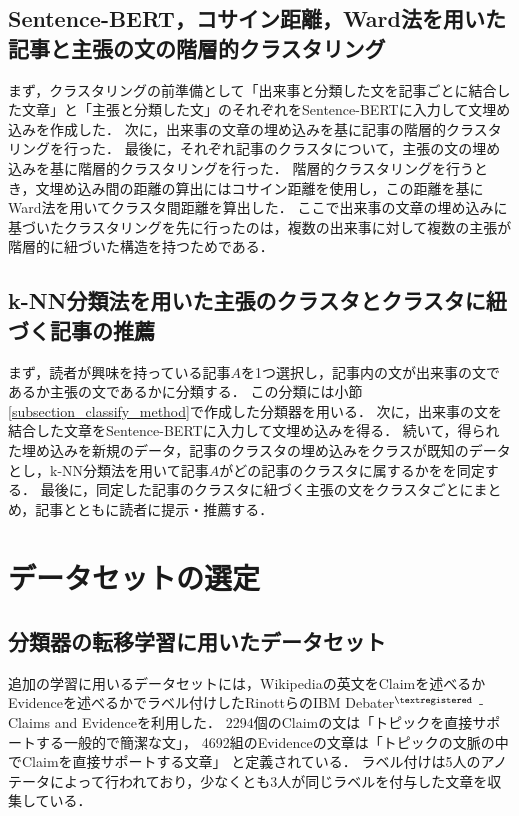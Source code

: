\documentclass[12pt,a4j]{jreport}
\begin{document}
\subsection{Sentence-BERT，コサイン距離，Ward法を用いた記事と主張の文の階層的クラスタリング}

まず，クラスタリングの前準備として「出来事と分類した文を記事ごとに結合した文章」と「主張と分類した文」のそれぞれをSentence-BERTに入力して文埋め込みを作成した．
次に，出来事の文章の埋め込みを基に記事の階層的クラスタリングを行った．
最後に，それぞれ記事のクラスタについて，主張の文の埋め込みを基に階層的クラスタリングを行った．
階層的クラスタリングを行うとき，文埋め込み間の距離の算出にはコサイン距離を使用し，この距離を基にWard法を用いてクラスタ間距離を算出した．
ここで出来事の文章の埋め込みに基づいたクラスタリングを先に行ったのは，複数の出来事に対して複数の主張が階層的に紐づいた構造を持つためである．

\subsection{k-NN分類法を用いた主張のクラスタとクラスタに紐づく記事の推薦}
まず，読者が興味を持っている記事$A$を1つ選択し，記事内の文が出来事の文であるか主張の文であるかに分類する．
この分類には小節\ref{subsection_classify_method}で作成した分類器を用いる．
次に，出来事の文を結合した文章をSentence-BERTに入力して文埋め込みを得る．
続いて，得られた埋め込みを新規のデータ，記事のクラスタの埋め込みをクラスが既知のデータとし，k-NN分類法を用いて記事$A$がどの記事のクラスタに属するかをを同定する．
最後に，同定した記事のクラスタに紐づく主張の文をクラスタごとにまとめ，記事とともに読者に提示・推薦する．


\section{データセットの選定}
\label{section_select_dataset}

\subsection{分類器の転移学習に用いたデータセット}
追加の学習に用いるデータセットには，Wikipediaの英文をClaimを述べるかEvidenceを述べるかでラベル付けしたRinottらのIBM Debater$^{\textregistered}$ - Claims and Evidenceを利用した\cite{rinott_show_2015}．
2294個のClaimの文は「トピックを直接サポートする一般的で簡潔な文」，
4692組のEvidenceの文章は「トピックの文脈の中でClaimを直接サポートする文章」
と定義されている．
ラベル付けは5人のアノテータによって行われており，少なくとも3人が同じラベルを付与した文章を収集している．
\end{document}
